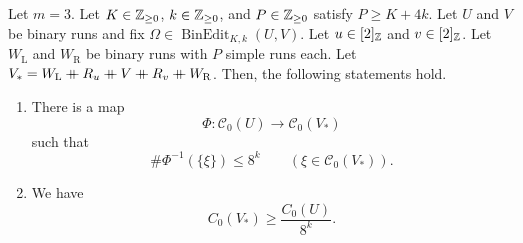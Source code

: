 \begin{proposition}\label{prop:exchange-composition}
Let $m=3$. Let $K\in\mathbb Z_{\ge0}$, $k\in\mathbb Z_{\ge0}$, and $P\in\mathbb Z_{\ge0}$ satisfy $P\ge K+4k$.
Let $U$ and $V$ be binary runs and fix $\Omega\in\operatorname{BinEdit}_{K,k}(U,V)$.
Let $u\in[2]_{\mathbb Z}$ and $v\in[2]_{\mathbb Z}$. Let $W_{\mathrm L}$ and $W_{\mathrm R}$ be binary runs with $P$ simple runs each.
Let $V_*=W_{\mathrm L}\ccn R_u\ccn V\ccn R_v\ccn W_{\mathrm R}$.
Then, the following statements hold.
\begin{enumerate}
\item\label{c:exchange-composition-map} There is a map
\[
 \Phi:\mathcal C_0(U)\longrightarrow\mathcal C_0(V_*)
\]
such that
\begin{equation}\label{eq:exchange-composition-fibers}
 \#\Phi^{-1}(\{\xi\})\le8^k\qquad(\xi\in\mathcal C_0(V_*)).
\end{equation}
\item\label{c:exchange-composition-count} We have
\begin{equation}\label{eq:exchange-composition}
 C_0(V_*)\ge\frac{C_0(U)}{8^k}.
\end{equation}
\end{enumerate}
\end{proposition}
